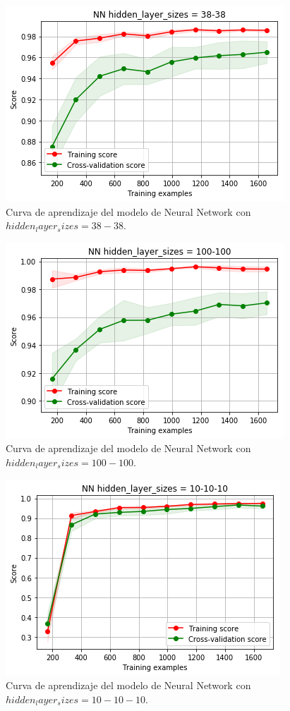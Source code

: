 \documentclass[11pt,a4paper]{article}
\begin{document}
\begin{figure}[H]
    \centering
    \includegraphics[scale=0.7]{img/lc-nn-38-38.png}
    \caption{Curva de aprendizaje del modelo de Neural Network con $hidden_layer_sizes=38-38$.}
    \label{fig:lc-nn-38-38}
\end{figure}

\begin{figure}[H]
    \centering
    \includegraphics[scale=0.7]{img/lc-nn-100-100.png}
    \caption{Curva de aprendizaje del modelo de Neural Network con $hidden_layer_sizes=100-100$.}
    \label{fig:lc-nn-100-100}
\end{figure}

\begin{figure}[H]
    \centering
    \includegraphics[scale=0.7]{img/lc-nn-10-10-10.png}
    \caption{Curva de aprendizaje del modelo de Neural Network con $hidden_layer_sizes=10-10-10$.}
    \label{fig:lc-nn-10-10-10}
\end{figure}
\end{document}
